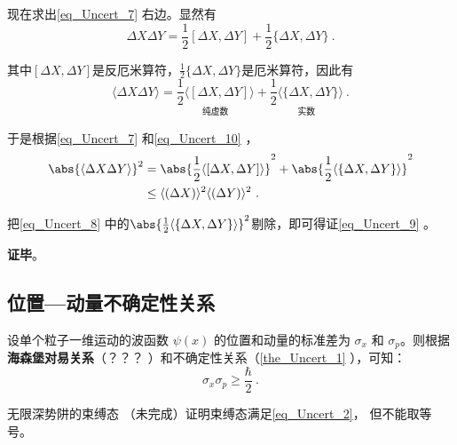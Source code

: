 现在求出\autoref{eq_Uncert_7} 右边。显然有
\begin{equation}
\Delta X \Delta Y = \frac{1}{2}[\Delta X, \Delta Y]+\frac{1}{2}\{\Delta X, \Delta Y\}~.
\end{equation}

其中$[\Delta X, \Delta Y]$是反厄米算符，$\frac{1}{2}\{\Delta X, \Delta Y\}$是厄米算符，因此有
\begin{equation}\label{eq_Uncert_10}
\langle\Delta X \Delta Y\rangle = \underset{\text{纯虚数}}{\frac{1}{2}\langle[\Delta X, \Delta Y]\rangle} + \underset{\text{实数}}{\frac{1}{2}\langle\{\Delta X, \Delta Y\}\rangle}~.
\end{equation}

于是根据\autoref{eq_Uncert_7} 和\autoref{eq_Uncert_10} ，
\begin{equation}\label{eq_Uncert_8}
\begin{aligned}
\abs{\langle\Delta X \Delta Y\rangle}^2 &= \abs{\frac{1}{2}\langle[\Delta X, \Delta Y]\rangle}^2+\abs{\frac{1}{2}\langle\{\Delta X, \Delta Y\}\rangle}^2\\
&\leq\langle (\Delta X)\rangle^2\langle (\Delta Y)\rangle^2~.
\end{aligned}
\end{equation}

把\autoref{eq_Uncert_8} 中的$\abs{\frac{1}{2}\langle\{\Delta X, \Delta Y\}\rangle}^2$剔除，即可得证\autoref{eq_Uncert_9} 。

\textbf{证毕}。






\subsection{位置—动量不确定性关系}
设单个粒子一维运动的波函数 $\psi(x)$ 的位置和动量的标准差为 $\sigma_x$ 和 $\sigma_p$。则根据\textbf{海森堡对易关系}（？？？
）和不确定性关系（\autoref{the_Uncert_1} ），可知：
\begin{equation}\label{eq_Uncert_2}
\sigma_x \sigma_p \geqslant \frac{\hbar}{2}~.
\end{equation}

\begin{example}{无限深势阱的束缚态}\label{ex_Uncert_2}
（未完成）证明束缚态满足\autoref{eq_Uncert_2}， 但不能取等号。
\end{example}

